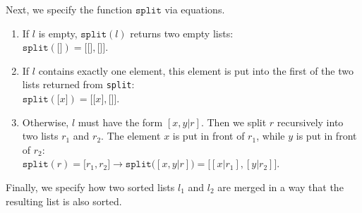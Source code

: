 \noindent
Next, we specify the function $\texttt{split}$ via equations.
\begin{enumerate}
\item If $l$ is empty, $\mathtt{split}(l)$ returns two empty lists:\\[0.2cm]
      \hspace*{1.3cm} 
      $\mathtt{split}(\texttt{[]}) = \mathtt{[} \texttt{[]}, \texttt{[]} \mathtt{]}$.
\item If $l$ contains exactly one element, this element is put into the first of the two lists
      returned from \texttt{split}: \\[0.2cm]
      \hspace*{1.3cm} 
      $\mathtt{split}(\mathtt{[}x\mathtt{]}) = \mathtt{[} \texttt{[}x\texttt{]}, \texttt{[]} \mathtt{]}$.
\item Otherwise, $l$ must have the form $[x, y | r]$.
      Then we split $r$ recursively into two lists $r_1$ and $r_2$.  The element $x$ is put in front
      of $r_1$, while $y$ is put in front of $r_2$:
      \\[0.2cm]
      \hspace*{1.3cm} 
      $\mathtt{split}(r) = \mathtt{[}r_1, r_2\mathtt{]} \rightarrow
      \mathtt{split}\bigl([x, y|r]\bigr) = \bigl[ [x|r_1], [y|r_2] \bigr]$.
\end{enumerate}
Finally, we specify how two sorted lists $l_1$ and $l_2$ are merged in a way that the resulting list
is also sorted.
